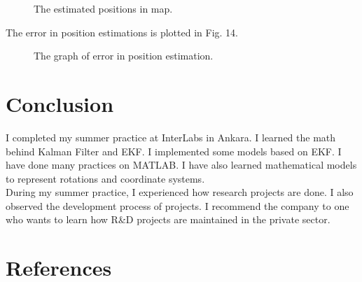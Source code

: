 \documentclass[12pt]{article}
\begin{document}
    \begin{figure}[H]
        \centerline{}
        \caption{The estimated positions in map.}
    \end{figure}
    The error in position estimations is plotted in Fig. 14.
    \begin{figure}[H]
        \centerline{}
        \caption{The graph of error in position estimation.}
    \end{figure}

    \section{Conclusion}   
    I completed my summer practice at InterLabs in Ankara. I learned the math behind Kalman Filter 
    and EKF. I implemented some models based on EKF. I have done many 
    practices on MATLAB. I have also learned mathematical models to represent 
    rotations and coordinate systems.\\ 
    During my summer practice, I experienced how research projects are done. I also observed 
    the development process of projects. I recommend the company 
    to one who wants to learn how R\&D projects are maintained in the private sector.
    
    \newpage
    \section{References}   
    
    

\end{document}
